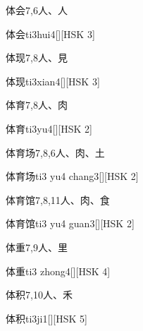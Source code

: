 \begin{entry}{体会}{7,6}{⼈、⼈}
  \begin{phonetics}{体会}{ti3hui4}[][HSK 3]
  \end{phonetics}
\end{entry}

\begin{entry}{体现}{7,8}{⼈、⾒}
  \begin{phonetics}{体现}{ti3xian4}[][HSK 3]
  \end{phonetics}
\end{entry}

\begin{entry}{体育}{7,8}{⼈、⾁}
  \begin{phonetics}{体育}{ti3yu4}[][HSK 2]
  \end{phonetics}
\end{entry}

\begin{entry}{体育场}{7,8,6}{⼈、⾁、⼟}
  \begin{phonetics}{体育场}{ti3 yu4 chang3}[][HSK 2]
  \end{phonetics}
\end{entry}

\begin{entry}{体育馆}{7,8,11}{⼈、⾁、⾷}
  \begin{phonetics}{体育馆}{ti3 yu4 guan3}[][HSK 2]
  \end{phonetics}
\end{entry}

\begin{entry}{体重}{7,9}{⼈、⾥}
  \begin{phonetics}{体重}{ti3 zhong4}[][HSK 4]
  \end{phonetics}
\end{entry}

\begin{entry}{体积}{7,10}{⼈、⽲}
  \begin{phonetics}{体积}{ti3ji1}[][HSK 5]
  \end{phonetics}
\end{entry}

